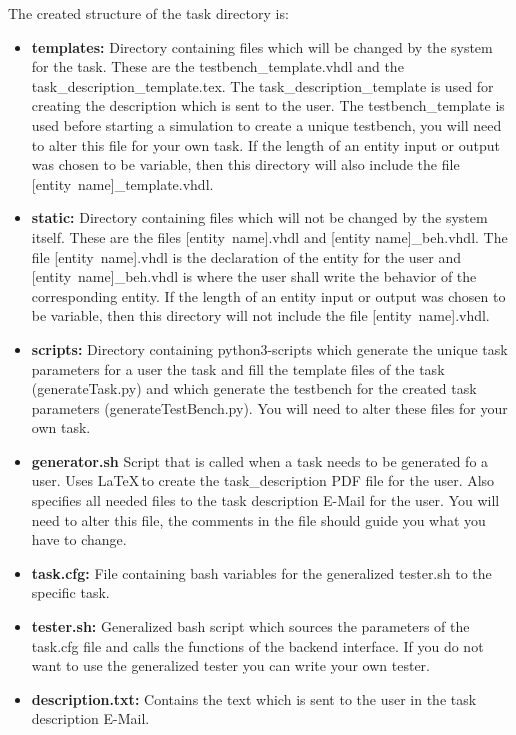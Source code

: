 The created structure of the task directory is:
\begin{itemize}
\item {\bf templates:} Directory containing files which will be changed by the system for the task. These are the
testbench\_template.vhdl and the task\_description\_template.tex. The task\_description\_template is used for creating
the description which is sent to the user. The testbench\_template is used before starting a simulation to create a
unique testbench, you will need to alter this file for your own task. If the length of an entity input or output was
chosen to be variable, then this directory will also include the file \mbox{[entity name]\_template.vhdl}.
\item {\bf static:} Directory containing files which will not be changed by the system itself. These are the files \mbox{[entity name].vhdl} and [entity name]\_beh.vhdl. The file \mbox{[entity name].vhdl} is the declaration of the entity for the user and \mbox{[entity name]\_beh.vhdl} is where the user shall write the behavior of the corresponding entity. If the length of an entity input or output was chosen to be variable, then this directory will not include the file \mbox{[entity name].vhdl}.
\item {\bf scripts:} Directory containing python3-scripts which generate the unique task parameters for a user the task and fill
the template files of the task (generateTask.py) and which generate the testbench for the created task parameters (generateTestBench.py). You will need to alter these files for your own task.
\item {\bf generator.sh} Script that is called when a task needs to be generated fo a user. Uses \LaTeX\,to create
the task\_description PDF file for the user. Also specifies all needed files to the task description E-Mail for the user. You will need to alter this file, the comments in the file should guide you what you have to change.
\item {\bf task.cfg:} File containing bash variables for the generalized tester.sh to the specific task.
\item {\bf tester.sh:} Generalized bash script which sources the parameters of the task.cfg file and calls the functions of the backend interface. If you do not want to use the generalized tester you can write your own tester.
\item {\bf description.txt:} Contains the text which is sent to the user in the task description E-Mail.
\end{itemize}


